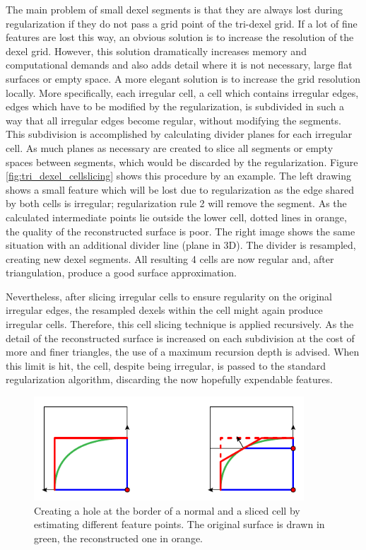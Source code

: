 The main problem of small dexel segments is that they are always lost during regularization if they do not pass a grid point of the tri-dexel grid.
If a lot of fine features are lost this way, an obvious solution is to increase the resolution of the dexel grid.
However, this solution dramatically increases memory and computational demands and also adds detail where it is not necessary, \eg large flat surfaces or empty space.
A more elegant solution is to increase the grid resolution locally.
More specifically, each irregular cell, \ie a cell which contains irregular edges, \ie edges which have to be modified by the regularization, is subdivided in such a way that all irregular edges become regular, without modifying the segments.
This subdivision is accomplished by calculating divider planes for each irregular cell.
As much planes as necessary are created to slice all segments or empty spaces between segments, which would be discarded by the regularization.
Figure \ref{fig:tri_dexel_cellslicing} shows this procedure by an example.
The left drawing shows a small feature which will be lost due to regularization as the edge shared by both cells is irregular; regularization rule 2 will remove the segment.
As the calculated intermediate points lie outside the lower cell, \cf dotted lines in orange, the quality of the reconstructed surface is poor.
The right image shows the same situation with an additional divider line (plane in 3D).
The divider is resampled, creating new dexel segments.
All resulting 4 cells are now regular and, after triangulation, produce a good surface approximation.

Nevertheless, after slicing irregular cells to ensure regularity on the original irregular edges, the resampled dexels within the cell might again produce irregular cells.
Therefore, this cell slicing technique is applied recursively.
As the detail of the reconstructed surface is increased on each subdivision at the cost of more and finer triangles, the use of a maximum recursion depth is advised.
When this limit is hit, the cell, despite being irregular, is passed to the standard regularization algorithm, discarding the now hopefully expendable features.

\begin{figure}
	\centering
	\includegraphics[width=0.9\textwidth]{images/tri_dexel_hole_creation}
	\caption{
		Creating a hole at the border of a normal and a sliced cell by estimating different feature points.
		The original surface is drawn in green, the reconstructed one in orange.
	}
	\label{fig:tri_dexel_hole_creation}
\end{figure}


